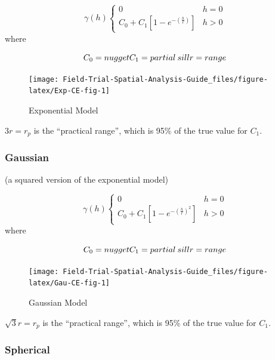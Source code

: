 \documentclass[
]{book}
\begin{document}
\[ \gamma (h)\left\{ {\begin{array}{cc} 0 & h = 0\\ C_0+C_1 \left [ 1-e^{-(\frac{h}{r})} \right] & h > 0 \end{array} } \right. \]
where

\[ C_0 = nugget \\ C_1 = partial \: sill \\ r = range\]

\begin{figure}

{\centering \texttt{[image: Field-Trial-Spatial-Analysis-Guide\_files/figure-latex/Exp-CE-fig-1]} 

}

\caption{Exponential Model}\label{fig:Exp-CE-fig}
\end{figure}

\(3r = r_p\) is the ``practical range'', which is 95\% of the true value for \(C_1\).

\hypertarget{gaussian}{%
\subsubsection{Gaussian}\label{gaussian}}

(a squared version of the exponential model)

\[ \gamma (h)\left\{ {\begin{array}{cc} 0 & h = 0\\ C_0+C_1 \left [ 1-e^{-(\frac{h}{r})^2} \right] & h > 0 \end{array} } \right. \]
where

\[ C_0 = nugget \\ C_1 = partial \: sill \\ r = range\]

\begin{figure}

{\centering \texttt{[image: Field-Trial-Spatial-Analysis-Guide\_files/figure-latex/Gau-CE-fig-1]} 

}

\caption{Gaussian Model}\label{fig:Gau-CE-fig}
\end{figure}

\(\sqrt 3r = r_p\) is the ``practical range'', which is 95\% of the true value for \(C_1\).

\hypertarget{spherical}{%
\subsubsection{Spherical}\label{spherical}}
\end{document}
